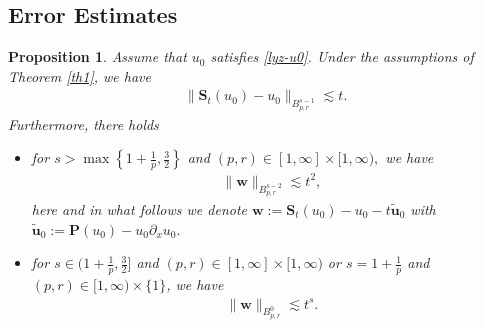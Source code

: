 \documentclass[12pt]{article}
\newtheorem{proposition}{Proposition}[section]
\newcommand{\pa}{\partial}
\newcommand{\f}{\left}
\newcommand{\g}{\right}
\begin{document}
\subsection{Error Estimates}\label{sec3.2}
\begin{proposition}\label{pro3.1}
Assume that $u_0$ satisfies \eqref{lyz-u0}. Under the assumptions of Theorem \ref{th1}, we have
\begin{align*}
&\|\mathbf{S}_{t}\left(u_{0}\right)-u_0\|_{B^{s-1}_{p,r}}\lesssim t.
\end{align*}
Furthermore, there holds
\begin{itemize}
  \item for $s>\max\f\{1+\frac{1}{p},\frac{3}{2}\g\}$ and $(p, r)\in [1, \infty]\times [1, \infty),$ we have
  \begin{align*}
\|\mathbf{w}\|_{B^{s-2}_{p,r}}\lesssim t^{2},
\end{align*}
here and in what follows we denote
$\mathbf{w}:=\mathbf{S}_{t}(u_0)-u_0-t\mathbf{\widetilde{u}}_0$ with $\mathbf{\widetilde{u}}_0:=\mathbf{P}(u_0)-u_0\pa_x u_0.$
  \item for $s\in\big(1+\frac{1}{p},\frac{3}{2}\big]$ and $(p, r)\in [1, \infty]\times [1, \infty)$ or $s=1+\frac{1}{p}$ and $(p, r)\in [1, \infty)\times \{1\}$, we have
  \begin{align*}
\|\mathbf{w}\|_{B^{0}_{p,r}}\lesssim t^{s}.
\end{align*}
\end{itemize}
\end{proposition}
\end{document}
